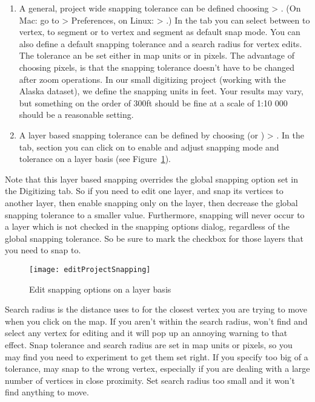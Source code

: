 \begin{enumerate}
\item A general, project wide snapping tolerance can be defined choosing
 > . 
(On Mac: go to  \mainmenuopt{\qg} > Preferences, on Linux:  > .)
In the  tab you can select between to vertex, to segment or
to vertex and segment as default snap mode. You can also define a default
snapping tolerance and a search radius for vertex edits. The tolerance an be 
set either in map units or in pixels. The advantage of choosing pixels, is 
that the snapping tolerance doesn't have to be changed after zoom operations. 
In our small digitizing project (working with the Alaska dataset), we define 
the snapping units in feet. Your results may vary, but something on the order 
of 300ft should be fine at a scale of 1:10 000 should be a reasonable 
setting.
\item A layer based snapping tolerance can be defined by choosing
 (or ) > . In the  tab, section  you
can click on  to enable and adjust snapping
mode and tolerance on a layer basis (see Figure~\ref{fig:snappingoptions}).
\end{enumerate}
Note that this layer based snapping overrides the global snapping option set in the Digitizing tab. So if you need to edit one layer, and snap its vertices to another layer, then enable snapping only on the  layer, then decrease the global snapping tolerance to a smaller value.  Furthermore, snapping will never occur to a layer which is not checked in the snapping options dialog, regardless of the global snapping tolerance. So be sure to mark the checkbox for those layers that you need to snap to.

\begin{figure}[ht]
   \centering
   \texttt{[image: editProjectSnapping]} 
   \caption{Edit snapping options on a layer basis \nixcaption}\label{fig:snappingoptions}
\end{figure}


Search radius is the distance \qg uses to  for the closest
vertex you are trying to move when you click on the
map. If you aren't within the search radius, \qg won't find and select
any vertex for editing and it will pop up an annoying warning to that effect.
Snap tolerance and search radius are set in map units or pixels, so you may find you
need to experiment to get them set right. If you specify too big of a
tolerance, \qg may snap to the wrong vertex, especially if you are dealing
with a large number of vertices in close proximity. Set search radius too
small and it won't find anything to move.

